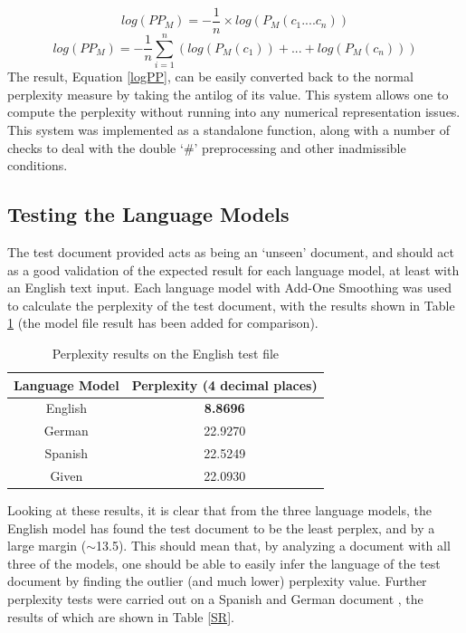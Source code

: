 \documentclass[12pt]{article}
\begin{document}
\[log\left(PP_{M}\right) = -\frac{1}{n}\times log\left(P_{M}\left( c_{1}.... c_{n}\right)\right)\]
\begin{equation}\label{logPP}
log\left(PP_{M}\right) = -\frac{1}{n} \sum_{i=1} ^{n}\left( log(P_{M}(c_{1})) + ... + log(P_{M}(c_{n})) \right)
\end{equation}
The result, Equation \ref{logPP}, can be easily converted back to the normal perplexity measure by taking the antilog of its value.  This system allows one to compute the perplexity without running into any numerical representation issues.  This system was implemented as a standalone function, along with a number of checks to deal with the double `\#' preprocessing and other inadmissible conditions.  
\subsection{Testing the Language Models}
The test document provided acts as being an `unseen' document, and should act as a good validation of the expected result for each language model, at least with an English text input.  Each language model with Add-One Smoothing was used to calculate the perplexity of the test document, with the results shown in Table \ref{TR} (the model file result has been added for comparison).
	\begin{table}[H]
	\centering
	\setlength\arrayrulewidth{1pt}
	\caption{\label{TR}Perplexity results on the English test file }
	\begin{tabular}{c  c }
		\hline
		\textbf{Language Model} & \textbf{Perplexity (4 decimal places)} \\
		\hline                     
	English& \textbf{8.8696}\\
	German & 22.9270 \\
	Spanish & 22.5249 \\
	Given & 22.0930\\
	\end{tabular}
\end{table}
Looking at these results, it is clear that from the three language models, the English model has found the test document to be the least perplex, and by a large margin ($\sim$13.5).  This should mean that, by analyzing a document with all three of the models, one should be able to easily infer the language of the test document by finding the outlier (and much lower) perplexity value.  Further perplexity tests were carried out on a Spanish \cite{GSpan} and German document \cite{GSpan}, the results of which are shown in Table \ref{SR}.
\end{document}
